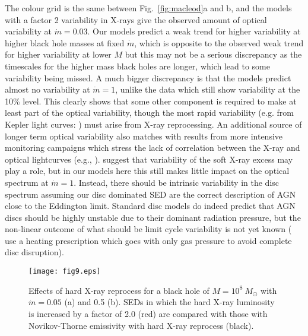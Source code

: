 \documentclass[a4paper,fleqn,usenatbib]{mnras}
\begin{document}
The colour grid is the same between Fig.~\ref{fig:macleod}a and b, and
the models with a factor 2 variability in X-rays give the observed
amount of optical variability at $\dot{m}=0.03$.  Our models predict a 
weak trend for higher variability at higher black hole masses at fixed $\dot{m}$, which
is opposite to the observed weak trend for higher variability at lower
$M$ but this may not be a serious discrepancy as the timescales for
the higher mass black holes are longer, which lead to some
variability being missed. A much bigger discrepancy is that the models
predict almost no variability at $\dot{m}=1$, unlike the data which
still show variability at the 10\% level.  This clearly shows that
some other component is required to make at least part of the optical
variability, though the most rapid variability (e.g. from Kepler light
curves: \citealt{aranzana2018}) must arise from X-ray reprocessing. 
An additional source of longer term optical variability also 
matches with results from more intensive monitoring
campaigns which stress the lack of correlation between the X-ray and
optical lightcurves (e.g., \citealt{arevalo2009}). 
\cite{gardner2017} suggest that variability of the soft X-ray excess may play a role, but
in our models here this still makes little impact on the optical spectrum at
$\dot{m}=1$. Instead, there should be intrinsic variability in the
disc spectrum assuming our disc dominated SED are the correct
description of AGN close to the Eddington limit. Standard disc models
do indeed predict that AGN discs should be highly unstable due to
their dominant radiation pressure, but the non-linear outcome of what
should be limit cycle variability is not yet known
(\citealt{hameury2009} use a heating prescription which goes with only
gas pressure to avoid complete disc disruption). 

\begin{figure}
\begin{center}
	\texttt{[image: fig9.eps]}	
\end{center}
\caption{Effects of hard X-ray reprocess
 for a black hole of $M=10^8~M_\odot$ with $\dot{m}=0.05$ (a) and 0.5 (b).
SEDs in which the hard X-ray luminosity is increased by a factor of 2.0 (red) are compared with those with Novikov-Thorne emissivity with hard X-ray reprocess (black).
}
\label{fig:reprocess_time}
\end{figure}
\end{document}

